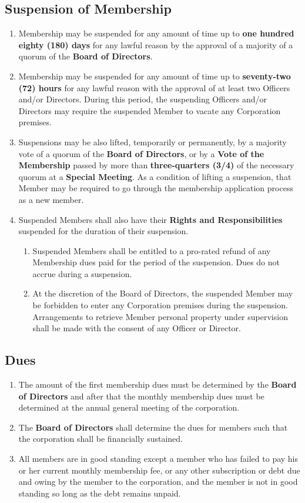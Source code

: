\documentclass{article}
\begin{document}
\subsection{Suspension of Membership}
\begin{enumerate}
	\item Membership may be suspended for any amount of time up to \textbf{one hundred eighty (180) days} for any lawful reason by the approval of a majority of a quorum of the \textbf{Board of Directors}.
	\item Membership may be suspended for any amount of time up to \textbf{seventy-two (72) hours} for any lawful reason with the approval of at least two Officers and/or Directors.  During this period, the suspending Officers and/or Directors may require the suspended Member to vacate any Corporation premises.
	\item Suspensions may be also lifted, temporarily or permanently, by a majority vote of a quorum of the \textbf{Board of Directors}, or by a \textbf{Vote of the Membership} passed by more than \textbf{three-quarters (3/4)} of the necessary quorum at a \textbf{Special Meeting}.  As a condition of lifting a suspension, that Member may be required to go through the membership application process as a new member.
	\item Suspended Members shall also have their \textbf{Rights and Responsibilities} suspended for the duration of their suspension.
	\begin{enumerate}
		\item Suspended Members shall be entitled to a pro-rated refund of any Membership dues paid for the period of the suspension.  Dues do not accrue during a suspension.
		\item At the discretion of the Board of Directors, the suspended Member may be forbidden to enter any Corporation premises during the suspension.  Arrangements to retrieve Member personal property under supervision shall be made with the consent of any Officer or Director.
	\end{enumerate}
\end{enumerate}

\subsection{Dues}
\begin{enumerate}
    \item The amount of the first membership dues must be determined by the \textbf{Board of Directors} and after that the monthly membership dues must be determined at the annual general meeting of the corporation.
    \item The \textbf{Board of Directors} shall determine the dues for members such that the corporation shall be financially sustained.
    \item All members are in good standing except a member who has failed to pay his or her current monthly membership fee, or any other subscription or debt due and owing by the member to the corporation, and the member is not in good standing so long as the debt remains unpaid.
\end{enumerate}
\end{document}
